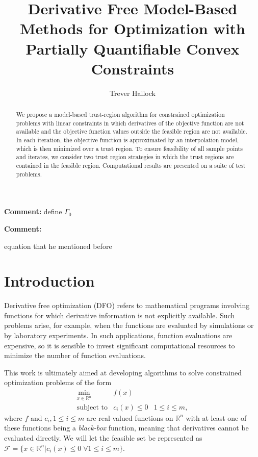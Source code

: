 \documentclass{article}
\title{Derivative Free Model-Based Methods for Optimization with Partially Quantifiable Convex Constraints}
\author{Trever Hallock}
\newenvironment{comment}
  {\par\medskip
   \color{red}%
   \begin{framed}
   \textbf{Comment: }\ignorespaces}
 {\end{framed}
  \medskip}
\theoremstyle{case}
\newcommand{\domain}{{\mathcal X}}
\newcommand{\feasible}{{\mathcal F}}
\newcommand{\huff}{{\Gamma_0}}
\newcommand{\Rn}{\mathbb R^n}
\begin{document}
\maketitle

\begin{abstract}

We propose a model-based trust-region algorithm for constrained optimization problems with linear constraints in which derivatives of the objective function are not available and the objective function values outside the feasible region are not available.
In each iteration, the objective function is approximated by an interpolation model, which is then minimized over a trust region.
To ensure feasibility of all sample points and iterates, we consider two trust region strategies in which the trust regions are contained in the feasible region.
Computational results are presented on a suite of test problems.

\end{abstract}

\newpage

\tableofcontents

\newpage


\begin{comment}
define $\huff$
\end{comment}


\begin{comment}

equation that he mentioned before

\end{comment}

\section{Introduction}

Derivative free optimization (DFO) refers to mathematical programs involving functions for which derivative information is not explicitly available.
Such problems arise, for example, when the functions are evaluated by simulations or by laboratory experiments.
In such applications, function evaluations are expensive, so it is sensible to invest significant computational resources to minimize the number of function evaluations.

This work is ultimately aimed at developing algorithms to solve constrained optimization problems of the form 
\[ \begin{array}{ccl} \min_{x \in \Rn} & f(x) \\
\mbox{subject to} & c_i(x) \le 0 & 1 \le i \le m,
\end{array}
\]
where 
$f$ and $c_i, 1 \le i \le m$ are real-valued functions on $\Rn$ with at least one of these functions being a {\em black-box} function, meaning that derivatives cannot be evaluated directly.
We will let the feasible set be represented as $\feasible = \{x \in \Rn | c_i(x) \le 0 \; \forall 1 \le i \le m \}$.
\end{document}

